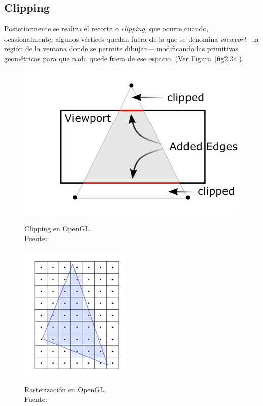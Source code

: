 \subsection{Clipping}
\label{ref:clipping}

Posteriormente se realiza el recorte o \textit{clipping}, que ocurre cuando,
ocasionalmente, algunos vértices quedan fuera de lo que se denomina
\textit{viewport}---la región de la ventana donde se permite dibujar---
modificando las primitivas geométricas para que nada quede fuera de ese espacio.
(Ver Figura~\ref{fig2.3a}).

\begin{figure}[h]
	\centering
	\begin{minipage}[b]{0.5\textwidth}
		\centering 
		\captionsetup{justification=centering}
		\includegraphics{figures/clipping.png}
		\caption[Clipping en OpenGL.]{Clipping en OpenGL. \\
		Fuente:~\cite{ClippingImage}}
		\label{fig2.3a}
	\end{minipage}\hfill
	\begin{minipage}[b]{0.5\textwidth}
		\centering 
		\captionsetup{justification=centering}
		\includegraphics{figures/rasterization.png}
		\caption[Rasterización en OpenGL.]{Rasterización en OpenGL. \\
		Fuente:~\cite{RasterizationImage}}
		\label{fig2.3b}
	\end{minipage}
\end{figure}

